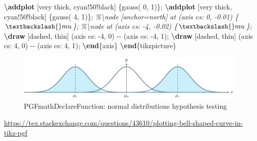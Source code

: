 \documentclass[
]{book}
\newenvironment{Shaded}{\begin{snugshade}}{\end{snugshade}}
\newcommand{\CommentTok}[1]{\textcolor[rgb]{0.56,0.35,0.01}{\textit{#1}}}
\newcommand{\ExtensionTok}[1]{#1}
\newcommand{\FunctionTok}[1]{\textcolor[rgb]{0.13,0.29,0.53}{\textbf{#1}}}
\newcommand{\KeywordTok}[1]{\textcolor[rgb]{0.13,0.29,0.53}{\textbf{#1}}}
\newcommand{\NormalTok}[1]{#1}
\theoremstyle{definition}
\theoremstyle{definition}
\theoremstyle{definition}
\theoremstyle{definition}
\theoremstyle{remark}
\begin{document}
\begin{Shaded}
\begin{Highlighting}[]
        \FunctionTok{\textbackslash{}addplot}\NormalTok{ [very thick, cyan!50!black] \{gauss( 0, 1)\};}
        \FunctionTok{\textbackslash{}addplot}\NormalTok{ [very thick, cyan!50!black] \{gauss( 4, 1)\};}
        \CommentTok{\%\textbackslash{}node [anchor=north] at (axis cs: 0, {-}0.01) \{$ \textbackslash{}mu $\};}
        \CommentTok{\%\textbackslash{}node at (axis cs: {-}4, {-}0.02) \{$ \textbackslash{}mu $\};}
        \FunctionTok{\textbackslash{}draw}\NormalTok{ [dashed, thin] (axis cs: {-}4, 0) {-}{-} (axis cs: {-}4, 1);}
        \FunctionTok{\textbackslash{}draw}\NormalTok{ [dashed, thin] (axis cs:  4, 0) {-}{-} (axis cs: 4, 1);}
    \KeywordTok{\textbackslash{}end}\NormalTok{\{}\ExtensionTok{axis}\NormalTok{\}}
\KeywordTok{\textbackslash{}end}\NormalTok{\{}\ExtensionTok{tikzpicture}\NormalTok{\}}
\end{Highlighting}
\end{Shaded}

\begin{figure}[H]
\includegraphics{202401311000-TikZ_files/figure-latex/unnamed-chunk-88-1} \caption{PGFmathDeclareFunction: normal distributions hypothesis testing}\label{fig:unnamed-chunk-88}
\end{figure}

\url{https://tex.stackexchange.com/questions/43610/plotting-bell-shaped-curve-in-tikz-pgf}
\end{document}
